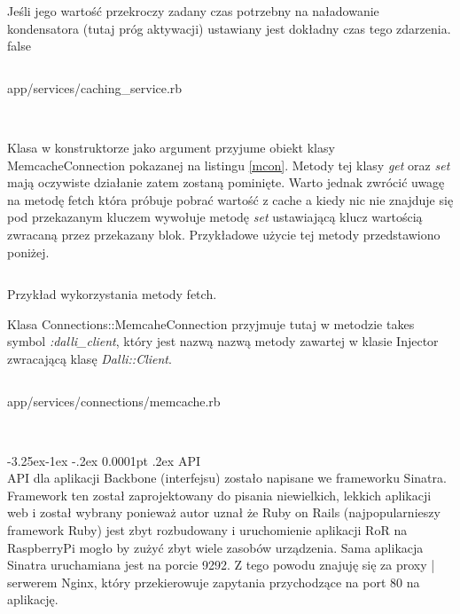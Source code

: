 \documentclass[11pt,a4paper, twoside]{article}
\makeatletter
\renewcommand\paragraph{\@startsection{paragraph}{4}{\z@}%
                                     {-3.25ex\@plus -1ex \@minus -.2ex}%
                                     {0.0001pt \@plus .2ex}%
                                     {\normalfont\normalsize\bfseries}}
\makeatother
\begin{document}
Jeśli jego wartość przekroczy zadany czas potrzebny na naładowanie kondensatora (tutaj próg aktywacji) ustawiany jest dokładny czas tego zdarzenia. %
\if false
\newpage
\begin{listing}[H]
\inputminted[linenos=true]{ruby}{./src/cachingservice.rb}
\caption{app/services/caching\_service.rb}
$\label{caching}$
\end{listing}
\noindent
Klasa w konstruktorze jako argument przyjume obiekt klasy \mbox{MemcacheConnection} pokazanej na listingu \ref{mcon}. Metody tej klasy \emph{get} oraz \emph{set} mają oczywiste działanie zatem zostaną pominięte. Warto jednak zwrócić uwagę na metodę fetch która próbuje pobrać wartość z cache a kiedy nic nie znajduje się pod przekazanym kluczem wywołuje metodę \emph{set} ustawiającą klucz wartością zwracaną przez przekazany blok. Przykładowe użycie tej metody przedstawiono poniżej.
\begin{listing}
\inputminted[linenos=true]{ruby}{./src/fetch.rb}
\caption{Przykład wykorzystania metody fetch.}
\end{listing}
\newpage
\noindent
Klasa Connections::MemcaheConnection przyjmuje tutaj w metodzie takes symbol \emph{:dalli\_client}, który jest nazwą nazwą metody zawartej w klasie Injector zwracającą klasę \emph{Dalli::Client}.
\begin{listing}
\inputminted[linenos=true]{ruby}{./src/memcache.rb}
\caption{app/services/connections/memcache.rb}
$\label{mcon}$
\end{listing}
\fi
\newpage
\paragraph{API} ~\\
\indent API dla aplikacji Backbone (interfejsu) zostało napisane we frameworku Sinatra. Framework ten został  zaprojektowany do pisania niewielkich, lekkich aplikacji web i został wybrany ponieważ autor uznał że Ruby on Rails (najpopularnieszy framework Ruby) jest zbyt rozbudowany i uruchomienie aplikacji RoR na RaspberryPi mogło by zużyć zbyt wiele zasobów urządzenia. Sama aplikacja Sinatra uruchamiana jest na porcie 9292. Z tego powodu znajuję się za proxy | serwerem Nginx, który przekierowuje zapytania przychodzące na port 80 na aplikację.
\end{document}
